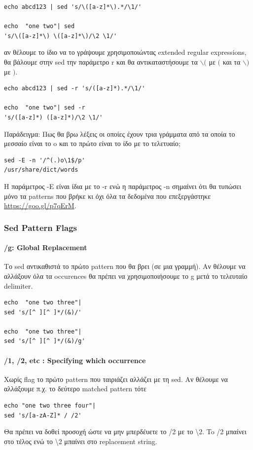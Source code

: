\begin{lstlisting}
echo abcd123 | sed 's/\([a-z]*\).*/\1/'

echo  "one two"| sed 
's/\([a-z]*\) \([a-z]*\)/\2 \1/'
\end{lstlisting}

αν θέλουμε το ίδιο να το γράψουμε χρησιμοποιώντας extended regular expressions, θα βάλουμε στην sed την παράμετρο \-r και θα αντικαταστήσουμε τα $\backslash($ με $($ και τα $\backslash)$ με $)$.

\begin{lstlisting}
echo abcd123 | sed -r 's/([a-z]*).*/\1/'

echo  "one two"| sed -r
's/([a-z]*) ([a-z]*)/\2 \1/'
\end{lstlisting}


Παράδειγμα: Πως θα βρω λέξεις οι οποίες έχουν τρια γράμματα από τα οποία το μεσσαίο είναι το o και το πρώτο είναι το ίδο με το τελετυαίο;

\begin{lstlisting}
sed -E -n '/^(.)o\1$/p' 
/usr/share/dict/words
\end{lstlisting}

Η παράμετρος -Ε είναι ίδια με το -r ενώ η παράμετρος -n σημαίνει ότι θα τυπώσει μόνο τα patterns που βρήκε κι όχι όλα τα δεδομένα που επεξεργάστηκε \href{https://goo.gl/p7qErM}{https://goo.gl/p7qErM}.
\subsubsection{Sed Pattern Flags}
\paragraph{/g: Global Replacement}
Το sed αντικαθιστά το πρώτο pattern που θα βρει (σε μια γραμμή). Αν θέλουμε να αλλάξουν όλα τα occurences θα πρέπει να χρησιμοποιήσουμε το g μετά το τελευταίο delimiter.

\begin{lstlisting}
echo  "one two three"| 
sed 's/[^ ][^ ]*/(&)/'

echo  "one two three"| 
sed 's/[^ ][^ ]*/(&)/g'
\end{lstlisting} 

\paragraph{/1, /2, etc : Specifying which occurrence}
Χωρίς flag το πρώτο pattern που ταιριάζει αλλάζει με τη sed. Aν θέλουμε να αλλάξουμε π.χ. το δεύτερο matched pattern τότε 
\begin{lstlisting}
echo "one two three four"| 
sed 's/[a-zA-Z]* / /2'
\end{lstlisting}
Θα πρέπει να δοθεί προσοχή ώστε να μην μπερδέυετε το /2 με το \textbackslash 2. To /2 μπαίνει στο τέλος ενώ το \textbackslash 2 μπαίνει στο replacement string.

